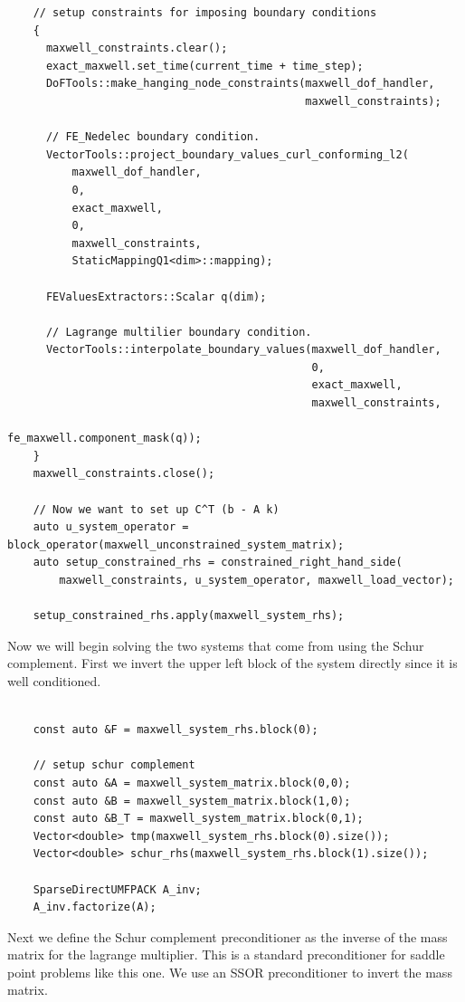 \documentclass{article}
\begin{document}
\begin{lstlisting}
    // setup constraints for imposing boundary conditions
    {
      maxwell_constraints.clear();
      exact_maxwell.set_time(current_time + time_step);
      DoFTools::make_hanging_node_constraints(maxwell_dof_handler,
                                              maxwell_constraints);

      // FE_Nedelec boundary condition.
      VectorTools::project_boundary_values_curl_conforming_l2(
          maxwell_dof_handler,
          0,
          exact_maxwell,
          0,
          maxwell_constraints,
          StaticMappingQ1<dim>::mapping);

      FEValuesExtractors::Scalar q(dim);

      // Lagrange multilier boundary condition.
      VectorTools::interpolate_boundary_values(maxwell_dof_handler,
                                               0,
                                               exact_maxwell,
                                               maxwell_constraints,
                                               fe_maxwell.component_mask(q));
    }
    maxwell_constraints.close();

    // Now we want to set up C^T (b - A k)
    auto u_system_operator = block_operator(maxwell_unconstrained_system_matrix);
    auto setup_constrained_rhs = constrained_right_hand_side(
        maxwell_constraints, u_system_operator, maxwell_load_vector);

    setup_constrained_rhs.apply(maxwell_system_rhs);
    \end{lstlisting}
    Now we will begin solving the two systems that come from using the Schur complement. First we invert the upper left block of the system directly since it is well conditioned. 
    \begin{lstlisting}

    const auto &F = maxwell_system_rhs.block(0);

    // setup schur complement
    const auto &A = maxwell_system_matrix.block(0,0);
    const auto &B = maxwell_system_matrix.block(1,0);
    const auto &B_T = maxwell_system_matrix.block(0,1);
    Vector<double> tmp(maxwell_system_rhs.block(0).size());
    Vector<double> schur_rhs(maxwell_system_rhs.block(1).size());

    SparseDirectUMFPACK A_inv;
    A_inv.factorize(A);
\end{lstlisting}
Next we define the Schur complement preconditioner as the inverse of the mass matrix for the lagrange multiplier. This is a standard preconditioner for saddle point problems like this one. We use an SSOR preconditioner to invert the mass matrix.
\end{document}
